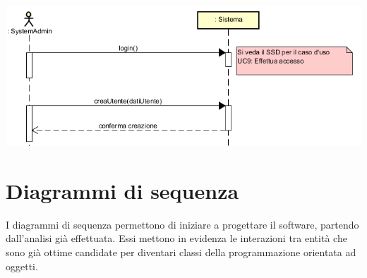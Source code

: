 \documentclass[12pt]{report}
\begin{document}
	\begin{center}
		\includegraphics{./images/SSD_UC8.png}
	\end{center}

	
	\noindent{}
	
	
	
	\newpage
	
	
	\section{Diagrammi di sequenza}
	
	I diagrammi di sequenza permettono di iniziare a progettare il software, partendo dall'analisi già effettuata. Essi mettono in evidenza le interazioni tra entità che sono già ottime candidate per diventari classi della programmazione orientata ad oggetti.
	
\end{document}
